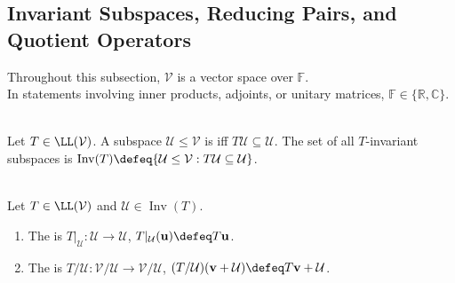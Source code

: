 \subsection{Invariant Subspaces, Reducing Pairs, and Quotient Operators}

Throughout this subsection, $\mathcal{V}$ is a vector space over $\mathbb{F}$.\\
In statements involving inner products, adjoints, or unitary matrices, $\mathbb{F}\in\{\mathbb{R},\mathbb{C}\}$.

\begin{definition} \label{def:invariant-subspace} \\
Let $T\in\LL(\mathcal{V})$. A subspace $\mathcal{U}\leq\mathcal{V}$ is  iff $T\mathcal{U}\subseteq\mathcal{U}$. The set of all $T$-invariant subspaces is $\operatorname{Inv}(T)\defeq\{\mathcal{U}\leq\mathcal{V}:T\mathcal{U}\subseteq\mathcal{U}\}$.
\end{definition}

\begin{definition} \label{def:restriction-and-quotient-operators} \\
Let $T\in\LL(\mathcal{V})$ and $\mathcal{U}\in\operatorname{Inv}(T)$.
\begin{enumerate}[label=(\roman*)]
\setlength{\itemsep}{0pt}
\item The  is $T|_{\mathcal{U}}:\mathcal{U}\to\mathcal{U}$, $T|_{\mathcal{U}}(\mathbf{u})\defeq T\mathbf{u}$.
\item The  is $T/\mathcal{U}:\mathcal{V}/\mathcal{U}\to\mathcal{V}/\mathcal{U}$, $(T/\mathcal{U})(\mathbf{v}+\mathcal{U})\defeq T\mathbf{v}+\mathcal{U}$.
\end{enumerate}
\end{definition}

